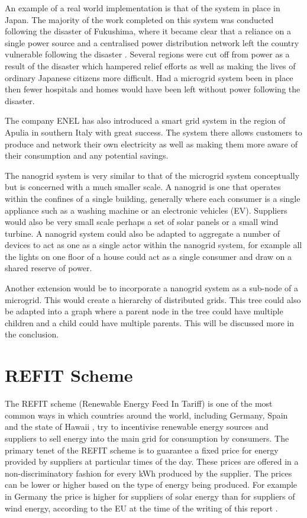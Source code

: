 \documentclass[a4paper, notitlepage]{report}
\begin{document}
An example of a real world implementation is that of the system in place in
Japan. The majority of the work completed on this system was conducted following
the disaster of Fukushima, where it became clear that a reliance on a single
power source and a centralised power distribution network left the country
vulnerable following the disaster \cite{japan_microgrids}. Several regions were
cut off from power as a result of the disaster which hampered relief efforts as
well as making the lives of ordinary Japanese citizens more difficult. Had a
microgrid system been in place then fewer hospitals and homes would have been
left without power following the disaster.

The company ENEL has also introduced a smart grid system in the region of Apulia
in southern Italy \cite{sapienza2013enel} with great success. The system there
allows customers to produce and network their own electricity as well as making
them more aware of their consumption and any potential savings.

The nanogrid system is very similar to that of the microgrid system conceptually
but is concerned with a much smaller scale. A nanogrid is one that operates
within the confines of a single building, generally where each consumer is a
single appliance such as a washing machine or an electronic vehicles (EV).
Suppliers would also be very small scale perhaps a set of solar panels or a
small wind turbine. A nanogrid system could also be adapted to aggregate a
number of devices to act as one as a single actor within the nanogrid system,
for example all the lights on one floor of a house could act as a single
consumer and draw on a shared reserve of power.

Another extension would be to incorporate a nanogrid system as a sub-node of a
microgrid. This would create a hierarchy of distributed grids. This tree could
also be adapted into a graph where a parent node in the tree could have multiple
children and a child could have multiple parents. This will be discussed more in
the conclusion.
\chapter{REFIT Scheme}
\label{sec:org97da66d}
The REFIT scheme (Renewable Energy Feed In Tariff) is one of the most common
ways in which countries around the world, including Germany, Spain and the state
of Hawaii \cite{couture2010analysis}, try to incentivise renewable energy sources
and suppliers to sell energy into the main grid for consumption by consumers.
The primary tenet of the REFIT scheme is to guarantee a fixed price for energy
provided by suppliers at particular times of the day. These prices are offered
in a non-discriminatory fashion for every kWh produced by the supplier. The
prices can be lower or higher based on the type of energy being produced. For
example in Germany the price is higher for suppliers of solar energy than for
suppliers of wind energy, according to the EU at the time of the writing of this
report \cite{refit_germany}.
\end{document}
